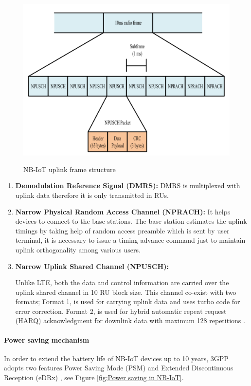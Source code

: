 \documentclass[12pt]{article}
\begin{document}
 \begin{figure}[H]
     \centering
     \includegraphics[width=0.9\columnwidth,height=9cm, keepaspectratio]{Images/nbiotUplinkFrame.pdf}
     \caption{NB-IoT uplink frame structure \cite{malik2018radio}}
     \label{fig:NB-IoT uplink frame structure}
 \end{figure}
 
 \begin{enumerate}
     \item \textbf{Demodulation Reference Signal (DMRS):} DMRS is multiplexed with uplink data therefore it is only transmitted in RUs.
     \item \textbf{Narrow Physical Random Access Channel (NPRACH):} It helps devices to connect to the base stations. The base station estimates the uplink timings by taking help of random access preamble which is sent by user terminal, it is necessary to issue a timing advance command just to maintain uplink orthogonality among various users.  
     \item \textbf{Narrow Uplink Shared Channel (NPUSCH):} 
     
      Unlike LTE, both the data and control information are carried over the uplink shared channel in 10 RU block size. This channel co-exist with two formats; Format 1, is used for carrying uplink data and uses turbo code for error correction. Format 2, is used for hybrid automatic repeat request (HARQ) acknowledgment for downlink data with maximum 128 repetitions \cite{malik2018radio}.
    
 \end{enumerate}
 
\paragraph{Power saving mechanism}
In order to extend the battery life of NB-IoT devices up to 10 years, 3GPP adopts two features Power Saving Mode (PSM) and Extended Discontinuous Reception (eDRx) , see Figure \ref{fig:Power saving in NB-IoT}.\par
\end{document}
